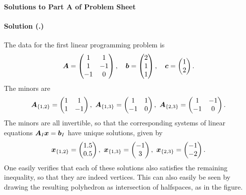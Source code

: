 \documentclass{article}
\newcounter{problemSheetNumber}
\newcounter{problems}
\renewcommand{\solution}[1]{\paragraph{Solution (\theproblemSheetNumber.\theproblems)}\addtocounter{problems}{1}\label{#1}}
\begin{document}
 
\begin{center}
{\Large {\bf Solutions to Part A of Problem Sheet \theproblemSheetNumber}}
\end{center}

\solution{pr3} The data for the first linear programming problem is
\begin{equation*}
 \bm{A} = \begin{pmatrix} 1 & 1\\ 1 & -1\\ -1 & 0\end{pmatrix}, \quad
 \bm{b} = \begin{pmatrix} 2\\1\\1 \end{pmatrix}, \quad
 \bm{c} = \begin{pmatrix} 1\\2\end{pmatrix}.
\end{equation*}
The minors are
\begin{equation*}
 \mtx{A}_{\{1,2\}} = \begin{pmatrix} 1 & 1 \\ 1&-1 \end{pmatrix}, \ 
 \mtx{A}_{\{1,3\}} = \begin{pmatrix} 1 & 1 \\ -1&0 \end{pmatrix}, \
 \mtx{A}_{\{2,3\}} = \begin{pmatrix} 1 & -1 \\ -1&0 \end{pmatrix}.
\end{equation*}
The minors are all invertible, so that the corresponding systems of linear equations $\bm{A}_I\bm{x}=\bm{b}_I$ have unique solutions, given by
\begin{equation*}
 \vct{x}_{\{1,2\}} = \begin{pmatrix} 1.5\\0.5\end{pmatrix}, \ 
 \vct{x}_{\{1,3\}} = \begin{pmatrix} -1\\3\end{pmatrix}, \
 \vct{x}_{\{2,3\}} = \begin{pmatrix} -1\\-2\end{pmatrix}.
\end{equation*}
One easily verifies that each of these solutions also satisfies the remaining inequality, so that they are indeed vertices. This can also easily be seen by drawing the resulting polyhedron as intersection of halfspaces, as in the figure.
\end{document}
